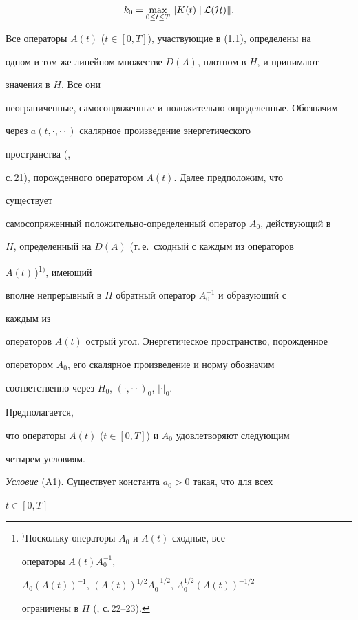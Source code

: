 $$ 


k_0=\max_{0\le t\le T}\|K(t)\mid\cal L(H)\|. 


$$ 


 


Все операторы $A(t)$ ($t\in[0,T]$), участвующие в (1.1), определены на 


одном и том же линейном множестве $D(A)$, плотном в $H$, и принимают 


значения в $H$. Все они 


неограниченные, самосопряженные и положительно-определенные. Обозначим 


через $a(t,\cdot,\cdot{}\cdot)$ скалярное произведение энергетического 


пространства (\cite{1}, 


с.\,21), порожденного оператором $A(t)$. Далее предположим, что 


существует 


самосопряженный положительно-определенный оператор $A_0$, действующий в 


$H$, определенный на $D(A)$ (т.\,е.~сходный с каждым из операторов 


$A(t)$\,)\footnote{$^)$Поскольку операторы $A_0$ и $A(t)$ сходные, все 


операторы $A(t)A^{-1}_0$, 


$A_0(A(t))^{-1}$, $(A(t))^{1/2}A^{-1/2}_0$, $A^{1/2}_0(A(t))^{-1/2}$ 


ограничены в $H$ (\cite{1}, с.\,22--23).}{$^)$}, имеющий 


вполне непрерывный в $H$ обратный оператор $A^{-1}_0$ и образующий с 


каждым из 


операторов $A(t)$ острый угол. Энергетическое пространство, порожденное 


оператором $A_0$, его скалярное произведение и норму обозначим 


соответственно через $H_0$, $(\cdot,\cdot{}\cdot)_0$, $|\cdot|_0$. 


Предполагается, 


что операторы $A(t)$ ($t\in[0,T]$) и $A_0$ удовлетворяют следующим 


четырем условиям. 


 


{\it Условие} (A1). Существует константа $a_0>0$ такая, что для всех 


$t\in[0,T]$


